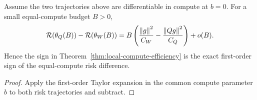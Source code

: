 \begin{corollary}\label{cor:local-break-even}
Assume the two trajectories above are differentiable in compute at $b=0$. For a small equal-compute budget $B>0$,
\[
\mathcal R(\theta_Q(B))-\mathcal R(\theta_W(B))
=
B\left(
\frac{\left\lVert g\right\rVert^2}{C_W}
-
\frac{\left\lVert Qg\right\rVert^2}{C_Q}
\right)+o(B).
\]
Hence the sign in Theorem~\ref{thm:local-compute-efficiency} is the exact first-order sign of the equal-compute risk difference.
\end{corollary}

\begin{proof}
Apply the first-order Taylor expansion in the common compute parameter $b$ to both risk trajectories and subtract.
\end{proof}

